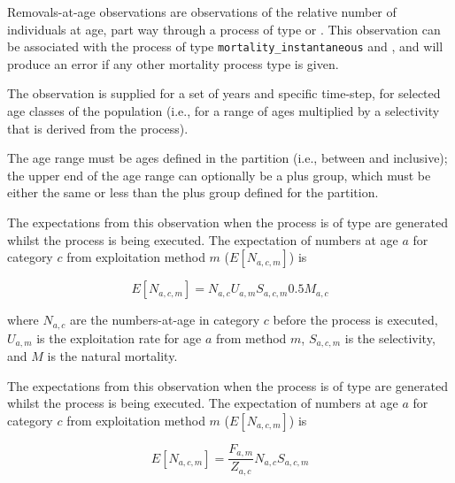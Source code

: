 \subsubsection{\label{sec:removals-by-age}}\label{sec:Observation-ProcessRemovalsByAge}

Removals-at-age observations are observations of the relative number of individuals at age, part way through a process of type  or . This observation can be  associated with the process of type \texttt{mortality\_instantaneous} and , and will produce an error if any other mortality process type is given.

The observation is supplied for a set of years and specific time-step, for selected age classes of the population (i.e., for a range of ages multiplied by a selectivity that is derived from the process).

The age range must be ages defined in the partition (i.e., between  and  inclusive); the upper end of the age range can optionally be a plus group, which must be either the same or less than the plus group defined for the partition.

The expectations from this observation when the process is of type  are generated whilst the process is being executed. The expectation of numbers at age $a$ for category $c$ from exploitation method $m$ ($E[N_{a,c,m}]$) is

\begin{equation}
	E[N_{a,c,m}] = N_{a,c} U_{a,m} S_{a,c,m} 0.5 M_{a,c}
\end{equation}

where $N_{a,c}$ are the numbers-at-age in category $c$ before the process is executed, $U_{a,m}$ is the exploitation rate for age $a$ from method $m$, $S_{a,c,m}$ is the selectivity, and $M$ is the natural mortality.

The expectations from this observation when the process is of type  are generated whilst the process is being executed. The expectation of numbers at age $a$ for category $c$ from exploitation method $m$ ($E[N_{a,c,m}]$) is

\begin{equation}
	E[N_{a,c,m}] = \frac{F_{a,m}}{Z_{a,c}} N_{a,c}  S_{a,c,m}
\end{equation}

